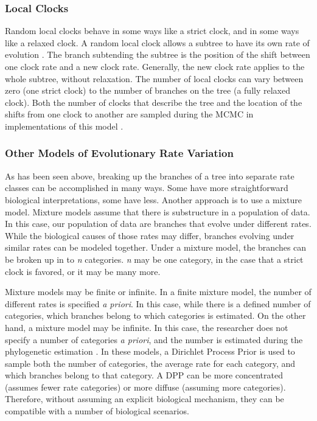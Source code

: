\documentclass[11pt]{article}
\begin{document}
\subsubsection{Local Clocks}

Random local clocks behave in some ways like a strict clock, and in some ways like a relaxed clock. 
A random local clock allows a subtree to have its own rate of evolution \cite{yoder2000}. 
The branch subtending the subtree is the position of the shift between one clock rate and a new clock rate. 
Generally, the new clock rate applies to the whole subtree, without relaxation.
The number of local clocks can vary between zero (one strict clock) to the number of branches on the tree (a fully relaxed clock).
Both the number of clocks that describe the tree and the location of the shifts from one clock to another are sampled during the MCMC in implementations of this model \cite{Drummond2010}. 


\subsubsection{Other Models of Evolutionary Rate Variation}

As has been seen above, breaking up the branches of a tree into separate rate classes can be accomplished in many ways.
Some have more straightforward biological interpretations, some have less. 
Another approach is to use a mixture model.
Mixture models assume that there is substructure in a population of data.
In this case, our population of data are branches that evolve under different rates.
While the biological causes of those rates may differ, branches evolving under similar rates can be modeled together. 
Under a mixture model, the branches can be broken up in to \textit{n} categories.
\textit{n} may be one category, in the case that a strict clock is favored, or it may be many more.

Mixture models may be finite or infinite.
In a finite mixture model, the number of different rates is specified \textit{a priori}. 
In this case, while there is a defined number of categories, which branches belong to which categories is estimated.
On the other hand, a mixture model may be infinite.
In this case, the researcher does not specify a number of categories \textit{a priori}, and the number is estimated during the phylogenetic estimation \cite{Heath2012a}.
In these models, a Dirichlet Process Prior is used to sample both the number of categories, the average rate for each category, and which branches belong to that category.
A DPP can be more concentrated (assumes fewer rate categories) or more diffuse (assuming more categories).
Therefore, without assuming an explicit biological mechanism, they can be compatible with a number of biological scenarios. 
\end{document}
